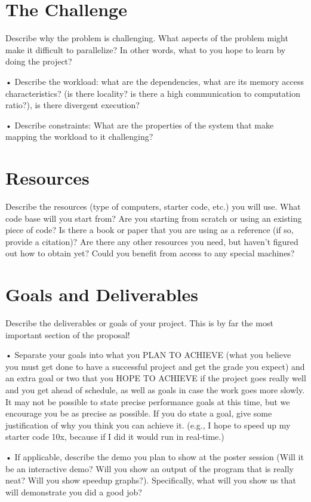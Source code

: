 \documentclass[11pt]{article}
\begin{document}
\section{The Challenge}
Describe why the problem is challenging. What aspects of the problem might make it difficult to parallelize? In other words, what to you hope to learn by doing the project?

• Describe the workload: what are the dependencies, what are its memory access characteristics? (is there locality? is there a high communication to computation ratio?), is there divergent execution?

• Describe constraints: What are the properties of the system that make mapping the workload to it challenging?

\section{Resources}
Describe the resources (type of computers, starter code, etc.) you will use. What code base will you start from? Are you starting from scratch or using an existing piece of code? Is there a book or paper that you are using as a reference (if so, provide a citation)? Are there any other resources you need, but haven’t figured out how to obtain yet? Could you benefit from access to any special machines?

\section{Goals and Deliverables}
Describe the deliverables or goals of your project. This is by far the most important section of the proposal!

• Separate your goals into what you PLAN TO ACHIEVE (what you believe you must get done to have a successful project and get the grade you expect) and an extra goal or two that you HOPE TO ACHIEVE if the project goes really well and you get ahead of schedule, as well as goals in case the work goes more slowly. It may not be possible to state precise performance goals at this time, but we encourage you be as precise as possible. If you do state a goal, give some justification of why you think you can achieve it. (e.g., I hope to speed up my starter code 10x, because if I did it would run in real-time.)

• If applicable, describe the demo you plan to show at the poster session (Will it be an interactive demo? Will you show an output of the program that is really neat? Will you show speedup graphs?). Specifically, what will you show us that will demonstrate you did a good job?
\end{document}
